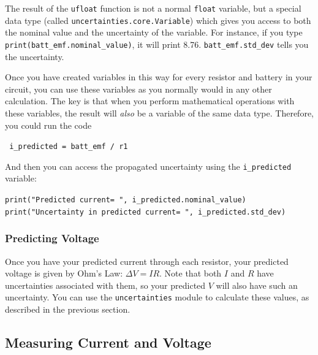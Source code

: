 \documentclass[12pt]{article}
\begin{document}
\begin{enumerate}
		The result of the \texttt{ufloat} function is not a normal \texttt{float} variable, but a special data type (called \texttt{uncertainties.core.Variable}) which gives you access to both the nominal value and the uncertainty of the variable. For instance, if you type \texttt{print(batt\_emf.nominal\_value)}, it will print 8.76. \texttt{batt\_emf.std\_dev} tells you the uncertainty.
		
		Once you have created variables in this way for every resistor and battery in your circuit, you can use these variables as you normally would in any other calculation. The key is that when you perform mathematical operations with these variables, the result will \textit{also} be a variable of the same data type. Therefore, you could run the code\\
		\begin{center}
			\texttt{ i\_predicted = batt\_emf / r1}
		\end{center}
	And then you can access the propagated uncertainty using the \texttt{i\_predicted} variable:\\
	\begin{center}
		\texttt{print("Predicted current= ", i\_predicted.nominal\_value)}\\
		\texttt{print("Uncertainty in predicted current= ", i\_predicted.std\_dev)}\
	\end{center}
	\end{enumerate}
	\subsubsection*{Predicting Voltage}
	Once you have your predicted current through each resistor, your predicted voltage is given by Ohm's Law: $\Delta V=IR$. Note that both $I$ and $R$ have uncertainties associated with them, so your predicted $V$ will also have such an uncertainty. You can use the \texttt{uncertainties} module to calculate these values, as described in the previous section.
	
	\subsection*{Measuring Current and Voltage}
	\label{measure}
\end{document}
